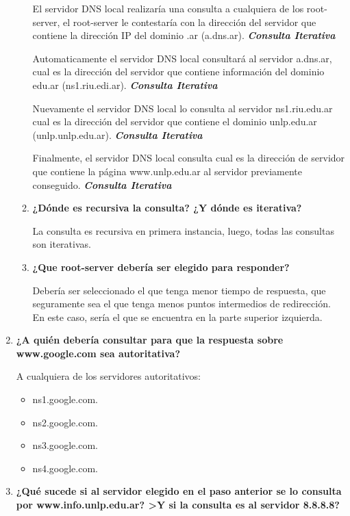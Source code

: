 \documentclass[a4paper,10pt]{article}
\begin{document}
\begin{enumerate}
\begin{enumerate}
                El servidor DNS local realizaría una consulta a cualquiera de los root-server, el root-server le contestaría con la dirección del servidor que contiene la dirección IP del dominio .ar (a.dns.ar). \textbf{\textit{Consulta Iterativa}}
                
                Automaticamente el servidor DNS local consultará al servidor a.dns.ar, cual es la dirección del servidor que contiene información del dominio edu.ar (ns1.riu.edi.ar). \textbf{\textit{Consulta Iterativa}}
                
                Nuevamente el servidor DNS local lo consulta al servidor ns1.riu.edu.ar cual es la dirección del servidor que contiene el dominio unlp.edu.ar (unlp.unlp.edu.ar). \textbf{\textit{Consulta Iterativa}}
                
                Finalmente, el servidor DNS local consulta cual es la dirección de servidor que contiene la página www.unlp.edu.ar al servidor previamente conseguido. \textbf{\textit{Consulta Iterativa}}
                
                \item \textbf{¿Dónde es recursiva la consulta? ¿Y dónde es iterativa?}
                
                La consulta es recursiva en primera instancia, luego, todas las consultas son iterativas.
                
                \item \textbf{¿Que root-server debería ser elegido para responder?}
                
                Debería ser seleccionado el que tenga menor tiempo de respuesta, que seguramente sea el que tenga menos puntos intermedios de redirección. En este caso, sería el que se encuentra en la parte superior izquierda.
            \end{enumerate}
            
        \item \textbf{¿A quién debería consultar para que la respuesta sobre www.google.com sea autoritativa?}
        
        A cualquiera de los servidores autoritativos:
        
            \begin{itemize}
                \item ns1.google.com.
                \item ns2.google.com.
                \item ns3.google.com.
                \item ns4.google.com.
            \end{itemize}
            
        \item \textbf{¿Qué sucede si al servidor elegido en el paso anterior se lo consulta por www.info.unlp.edu.ar? >Y si la consulta es al servidor 8.8.8.8?}
    \end{enumerate}
\end{document}
